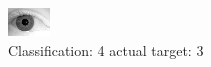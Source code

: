 \begin{figure}[h!]
\begin{center}
\includegraphics[width=0.60\columnwidth]{figures/ID2125_class_4_target_3.png}
\end{center}
\caption{ Classification: 4 actual target: 3}
\label{fig:ID2125_class_4_target_3}
\end{figure}
